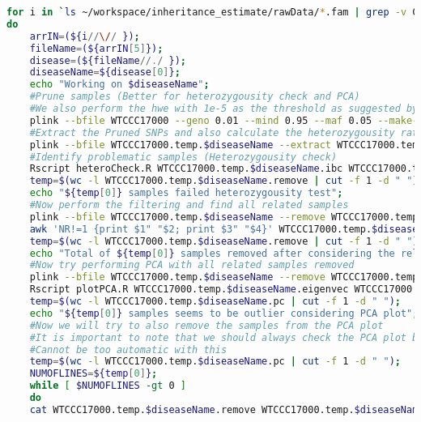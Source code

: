 \documentclass[12pt]{article}
\begin{document}
	\begin{lstlisting}[language=bash]
for i in `ls ~/workspace/inheritance_estimate/rawData/*.fam | grep -v CC`;
do
	arrIN=(${i//\// });
	fileName=(${arrIN[5]});
	disease=(${fileName//./ });
	diseaseName=${disease[0]};
	echo "Working on $diseaseName";
	#Prune samples (Better for heterozygousity check and PCA)
	#We also perform the hwe with 1e-5 as the threshold as suggested by Clara
	plink --bfile WTCCC17000 --geno 0.01 --mind 0.95 --maf 0.05 --make-bed --out WTCCC17000.temp.$diseaseName --threads 10 --indep 50 5 2 --keep $i >/dev/null 2>&1; 
	#Extract the Pruned SNPs and also calculate the heterozygousity rate
	plink --bfile WTCCC17000.temp.$diseaseName --extract WTCCC17000.temp.$diseaseName.prune.in --ibc --out WTCCC17000.temp.$diseaseName --threads 10 >/dev/null 2>&1;
	#Identify problematic samples (Heterozygousity check)
	Rscript heteroCheck.R WTCCC17000.temp.$diseaseName.ibc WTCCC17000.temp.$diseaseName.remove >/dev/null 2>&1;
	temp=$(wc -l WTCCC17000.temp.$diseaseName.remove | cut -f 1 -d " ");
	echo "${temp[0]} samples failed heterozygousity test";
	#Now perform the filtering and find all related samples
	plink --bfile WTCCC17000.temp.$diseaseName --remove WTCCC17000.temp.$diseaseName.remove --extract WTCCC17000.temp.$diseaseName.prune.in --genome --min 0.125 --threads 10 --out WTCCC17000.temp.$diseaseName>/dev/null 2>&1;
	awk 'NR!=1 {print $1" "$2; print $3" "$4}' WTCCC17000.temp.$diseaseName.genome | sort | uniq >> WTCCC17000.temp.$diseaseName.remove;
	temp=$(wc -l WTCCC17000.temp.$diseaseName.remove | cut -f 1 -d " ");
	echo "Total of ${temp[0]} samples removed after considering the relationship";
	#Now try performing PCA with all related samples removed
	plink --bfile WTCCC17000.temp.$diseaseName --remove WTCCC17000.temp.$diseaseName.remove --extract WTCCC17000.temp.$diseaseName.prune.in --genome --min 0.125 --threads 10 --pca --out WTCCC17000.temp.$diseaseName >/dev/null 2>&1;
	Rscript plotPCA.R WTCCC17000.temp.$diseaseName.eigenvec WTCCC17000.temp.$diseaseName >/dev/null 2>&1;
	temp=$(wc -l WTCCC17000.temp.$diseaseName.pc | cut -f 1 -d " ");
	echo "${temp[0]} samples seems to be outlier considering PCA plot";
	#Now we will try to also remove the samples from the PCA plot
	#It is important to note that we should always check the PCA plot beforehand
	#Cannot be too automatic with this
	temp=$(wc -l WTCCC17000.temp.$diseaseName.pc | cut -f 1 -d " ");
	NUMOFLINES=${temp[0]};
	while [ $NUMOFLINES -gt 0 ]
	do
	cat WTCCC17000.temp.$diseaseName.remove WTCCC17000.temp.$diseaseName.pc > WTCCC17000.temp.$diseaseName.remove.temp;

\end{lstlisting}
\end{document}
